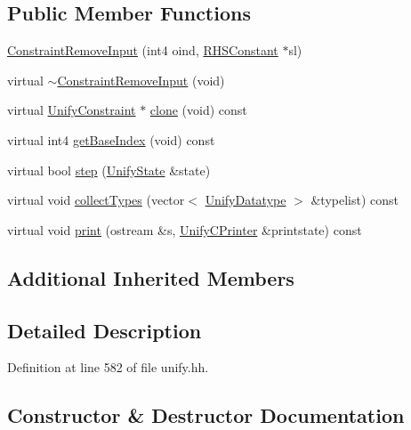 \subsection*{Public Member Functions}
\begin{DoxyCompactItemize}
\item 
\mbox{\hyperlink{class_constraint_remove_input_a45e8c0eaebefde80e445d3cc1912c27b}{Constraint\+Remove\+Input}} (int4 oind, \mbox{\hyperlink{class_r_h_s_constant}{R\+H\+S\+Constant}} $\ast$sl)
\item 
virtual \mbox{\hyperlink{class_constraint_remove_input_a56450fd325c9f096fded3544210d182a}{$\sim$\+Constraint\+Remove\+Input}} (void)
\item 
virtual \mbox{\hyperlink{class_unify_constraint}{Unify\+Constraint}} $\ast$ \mbox{\hyperlink{class_constraint_remove_input_a619d3e7e57bb78322bbd889d123a5994}{clone}} (void) const
\item 
virtual int4 \mbox{\hyperlink{class_constraint_remove_input_a5e5b7c0b890bd9b8306d7d540cd800c4}{get\+Base\+Index}} (void) const
\item 
virtual bool \mbox{\hyperlink{class_constraint_remove_input_a8ca6138d7f67a2eb97ad988aeb57d54a}{step}} (\mbox{\hyperlink{class_unify_state}{Unify\+State}} \&state)
\item 
virtual void \mbox{\hyperlink{class_constraint_remove_input_a435c6f9bb7103060adbcb850f09a03e8}{collect\+Types}} (vector$<$ \mbox{\hyperlink{class_unify_datatype}{Unify\+Datatype}} $>$ \&typelist) const
\item 
virtual void \mbox{\hyperlink{class_constraint_remove_input_a4fe12c997302e5865584632c1823af00}{print}} (ostream \&s, \mbox{\hyperlink{class_unify_c_printer}{Unify\+C\+Printer}} \&printstate) const
\end{DoxyCompactItemize}
\subsection*{Additional Inherited Members}


\subsection{Detailed Description}


Definition at line 582 of file unify.\+hh.



\subsection{Constructor \& Destructor Documentation}
\mbox{\label{class_constraint_remove_input_a45e8c0eaebefde80e445d3cc1912c27b}} 
